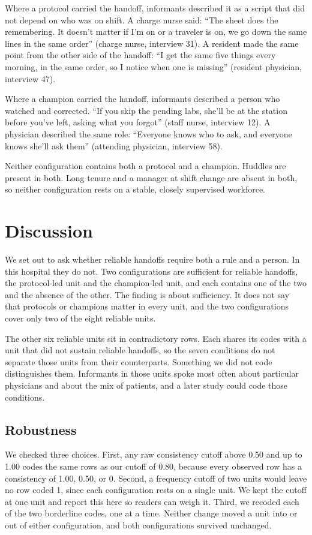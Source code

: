\documentclass[12pt]{article}
\begin{document}
Where a protocol carried the handoff, informants described it as a script that did not depend on who was on shift. A charge nurse said: ``The sheet does the remembering. It doesn't matter if I'm on or a traveler is on, we go down the same lines in the same order'' (charge nurse, interview 31). A resident made the same point from the other side of the handoff: ``I get the same five things every morning, in the same order, so I notice when one is missing'' (resident physician, interview 47).

Where a champion carried the handoff, informants described a person who watched and corrected. ``If you skip the pending labs, she'll be at the station before you've left, asking what you forgot'' (staff nurse, interview 12). A physician described the same role: ``Everyone knows who to ask, and everyone knows she'll ask them'' (attending physician, interview 58).

Neither configuration contains both a protocol and a champion. Huddles are present in both. Long tenure and a manager at shift change are absent in both, so neither configuration rests on a stable, closely supervised workforce.

\section{Discussion}

We set out to ask whether reliable handoffs require both a rule and a person. In this hospital they do not. Two configurations are sufficient for reliable handoffs, the protocol-led unit and the champion-led unit, and each contains one of the two and the absence of the other. The finding is about sufficiency. It does not say that protocols or champions matter in every unit, and the two configurations cover only two of the eight reliable units.

The other six reliable units sit in contradictory rows. Each shares its codes with a unit that did not sustain reliable handoffs, so the seven conditions do not separate those units from their counterparts. Something we did not code distinguishes them. Informants in those units spoke most often about particular physicians and about the mix of patients, and a later study could code those conditions.

\subsection{Robustness}

We checked three choices. First, any raw consistency cutoff above 0.50 and up to 1.00 codes the same rows as our cutoff of 0.80, because every observed row has a consistency of 1.00, 0.50, or 0. Second, a frequency cutoff of two units would leave no row coded 1, since each configuration rests on a single unit. We kept the cutoff at one unit and report this here so readers can weigh it. Third, we recoded each of the two borderline codes, one at a time. Neither change moved a unit into or out of either configuration, and both configurations survived unchanged.
\end{document}
